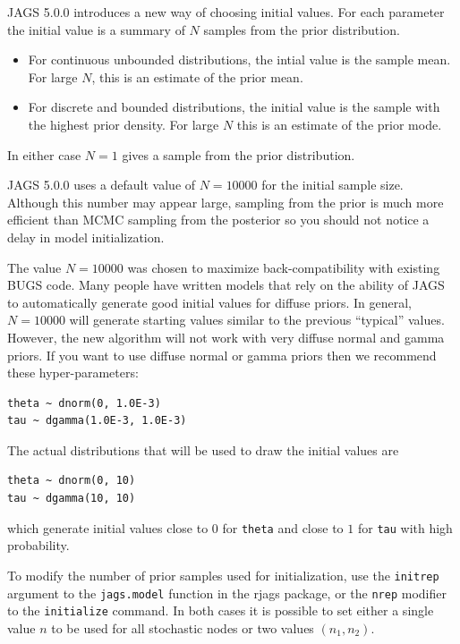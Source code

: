 \documentclass[11pt, a4paper, titlepage]{report}
\begin{document}
JAGS 5.0.0 introduces a new way of choosing initial values. For each
parameter the initial value is a summary of $N$ samples from the prior
distribution.
\begin{itemize}
\item For continuous unbounded distributions, the intial value is the
  sample mean. For large $N$, this is an estimate of the prior mean.
\item For discrete and bounded distributions, the initial value is
  the sample with the highest prior density. For large $N$ this is
  an estimate of the prior mode.
\end{itemize}
In either case $N=1$ gives a sample from the prior distribution.

JAGS 5.0.0 uses a default value of $N=10000$ for the initial sample
size. Although this number may appear large, sampling from the prior
is much more efficient than MCMC sampling from the posterior so you
should not notice a delay in model initialization.

The value $N=10000$ was chosen to maximize back-compatibility with
existing BUGS code. Many people have written models that rely on the
ability of JAGS to automatically generate good initial values for
diffuse priors. In general, $N=10000$ will generate starting values
similar to the previous ``typical'' values. However, the new algorithm
will not work with very diffuse normal and gamma priors. If you want
to use diffuse normal or gamma priors then we recommend these
hyper-parameters:

\begin{verbatim}
theta ~ dnorm(0, 1.0E-3)
tau ~ dgamma(1.0E-3, 1.0E-3)
\end{verbatim}

The actual distributions that will be used to draw the initial values are

\begin{verbatim}
theta ~ dnorm(0, 10)
tau ~ dgamma(10, 10)
\end{verbatim}
which generate initial values close to $0$ for \texttt{theta} and
close to $1$ for \texttt{tau} with high probability.

To modify the number of prior samples used for initialization, use the
\texttt{initrep} argument to the \texttt{jags.model} function in the
\textsf{rjags} package, or the \texttt{nrep} modifier to the
\texttt{initialize} command. In both cases it is possible to set
either a single value $n$ to be used for all stochastic nodes or two
values $(n_1, n_2)$.
\end{document}
